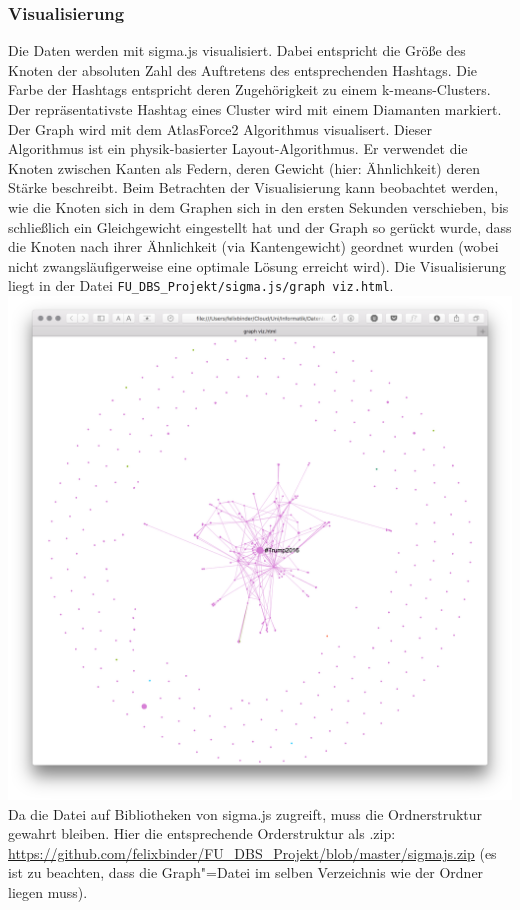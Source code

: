 \documentclass[BCOR0mm,fontsize=12pt,paper=a4,final,numbers=noenddot]{scrartcl}
\begin{document}
\subsubsection{Visualisierung}
Die Daten werden mit sigma.js visualisiert. Dabei entspricht die Größe des Knoten der absoluten Zahl des Auftretens des entsprechenden Hashtags. Die Farbe der Hashtags entspricht deren Zugehörigkeit zu einem k-means-Clusters. Der repräsentativste Hashtag eines Cluster wird mit einem Diamanten markiert. Der Graph wird mit dem AtlasForce2 Algorithmus visualisert. Dieser Algorithmus ist ein physik-basierter Layout-Algorithmus. Er verwendet die Knoten zwischen Kanten als Federn, deren Gewicht (hier: Ähnlichkeit) deren Stärke beschreibt. Beim Betrachten der Visualisierung kann beobachtet werden, wie die Knoten sich in dem Graphen sich in den ersten Sekunden verschieben, bis schließlich ein Gleichgewicht eingestellt hat und der Graph so gerückt wurde, dass die Knoten nach ihrer Ähnlichkeit (via Kantengewicht) geordnet wurden (wobei nicht zwangsläufigerweise eine optimale Lösung erreicht wird). Die Visualisierung liegt in der Datei \texttt{FU\_DBS\_Projekt/sigma.js/graph viz.html}.\\
\includegraphics[width=1\textwidth]{visualized.png} Da die Datei auf Bibliotheken von sigma.js zugreift, muss die Ordnerstruktur gewahrt bleiben. Hier die entsprechende Orderstruktur als .zip: \url{https://github.com/felixbinder/FU_DBS_Projekt/blob/master/sigmajs.zip} (es ist zu beachten, dass die Graph"=Datei im selben Verzeichnis wie der Ordner liegen muss).
\end{document}

